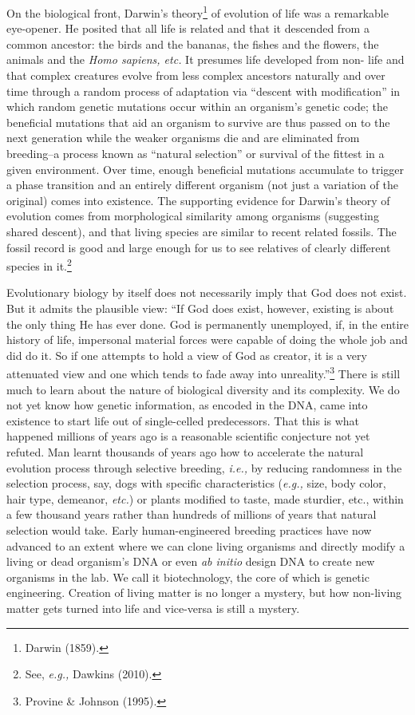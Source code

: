 \begin{multicols}{2}
On the biological front, Darwin's theory\footnote{Darwin (1859).} of evolution of life was a remarkable eye-opener. He posited
that all life is related and that it descended from a common ancestor: the birds and the bananas, the
fishes and the flowers, the animals and the \textit{Homo sapiens, etc.} It presumes life developed from non-
life and that complex creatures evolve from less complex ancestors naturally and over time through a
random process of adaptation via “descent with modification” in which random genetic mutations
occur within an organism's genetic code; the beneficial mutations that aid an organism to survive are
thus passed on to the next generation while the weaker organisms die and are eliminated from
breeding--a process known as “natural selection” or survival of the fittest in a given environment.
Over time, enough beneficial mutations accumulate to trigger a phase transition and an entirely
different organism (not just a variation of the original) comes into existence. The supporting evidence
for Darwin's theory of evolution comes from morphological similarity among organisms (suggesting
shared descent), and that living species are similar to recent related fossils. The fossil record is good
and large enough for us to see relatives of clearly different species in it.\footnote{See, \textit{e.g.,} Dawkins (2010).}

Evolutionary biology by itself does not necessarily imply that God does not exist. But it admits the
plausible view: “If God does exist, however, existing is about the only thing He has ever done. God is
permanently unemployed, if, in the entire history of life, impersonal material forces were capable of
doing the whole job and did do it. So if one attempts to hold a view of God as creator, it is a very
attenuated view and one which tends to fade away into unreality.”\footnote{Provine \& Johnson (1995).}  There is still much to learn about the nature of biological diversity and its complexity. We do not yet know how genetic information, as encoded in the DNA, came into existence to start life out of single-celled predecessors. That this is what happened millions of years ago is a reasonable scientific conjecture not yet refuted. Man learnt thousands of years ago how to accelerate the natural evolution process through selective breeding, \textit{i.e.,} by reducing randomness in the selection process, say, dogs with specific characteristics (\textit{e.g.,} size, body color, hair type, demeanor, \textit{etc.}) or plants modified to taste, made sturdier, etc., within a few thousand years rather than hundreds of millions of years that natural selection would take. Early human-engineered breeding practices have now advanced to an extent where we can clone living organisms and directly modify a living or dead organism's DNA or even \textit{ab initio} design DNA to create new organisms in the lab. We call it biotechnology, the core of which is genetic engineering. Creation of living matter is no longer a mystery, but how non-living matter gets turned into life and vice-versa is still a mystery.


\end{multicols}
